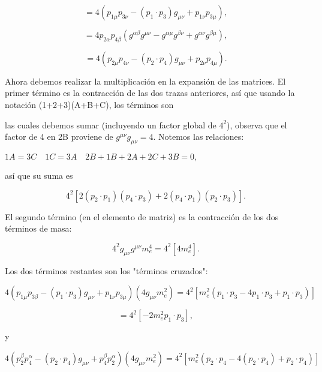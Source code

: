 \begin{equation}
= 4 (p_{1\mu} p_{3\nu} - (p_1 \cdot p_3) g_{\mu\nu} + p_{1\nu} p_{3\mu}),
\end{equation}

\begin{equation}
= 4 p_{2\alpha} p_{4\beta} \left( g^{\alpha \beta} g^{\mu \nu} - g^{\alpha \mu} g^{\beta \nu} + g^{\alpha \nu} g^{\beta \mu} \right),
\end{equation}

\begin{equation}
= 4 (p_{2\mu} p_{4\nu} - (p_2 \cdot p_4) g_{\mu\nu} + p_{2\nu} p_{4\mu}).
\end{equation}

Ahora debemos realizar la multiplicación en la expansión de las matrices. El primer término es la contracción de las dos trazas anteriores, así que usando la notación (1+2+3)(A+B+C), los términos son


las cuales debemos sumar (incluyendo un factor global de $4^2$), observa que el factor de 4 en 2B proviene de $g^{\mu\nu}g_{\mu\nu} = 4$. Notemos las relaciones:

$ 1A = 3C \quad 1C = 3A \quad 2B + 1B + 2A + 2C + 3B = 0, $

así que su suma es

\begin{equation}
4^2 \left[ 2(p_2 \cdot p_1)(p_4 \cdot p_3) + 2(p_4 \cdot p_1)(p_2 \cdot p_3) \right].
\end{equation}

El segundo término (en el elemento de matriz) es la contracción de los dos términos de masa:

\begin{equation}
4^2 g_{\mu\nu} g^{\mu\nu} m_e^4 = 4^2 [4m_e^4].
\end{equation}

Los dos términos restantes son los "términos cruzados":

\begin{equation}
4 (p_{1\mu} p_{3\beta} - (p_1 \cdot p_3) g_{\mu \nu} + p_{1\nu} p_{3\mu})(4g_{\mu \nu} m_e^2) = 4^2 \left[ m_e^2 (p_1 \cdot p_3 - 4p_1 \cdot p_3 + p_1 \cdot p_3) \right]
\end{equation}

\begin{equation}
= 4^2 \left[ -2m_e^2 p_1 \cdot p_3 \right],
\end{equation}

y

\begin{equation}
4 (p_2^\beta p_4^\alpha - (p_2 \cdot p_4) g_{\mu \nu} + p_4^\beta p_2^\alpha)(4g_{\mu \nu} m_e^2) = 4^2 \left[ m_e^2 (p_2 \cdot p_4 - 4(p_2 \cdot p_4) + p_2 \cdot p_4) \right]
\end{equation}

